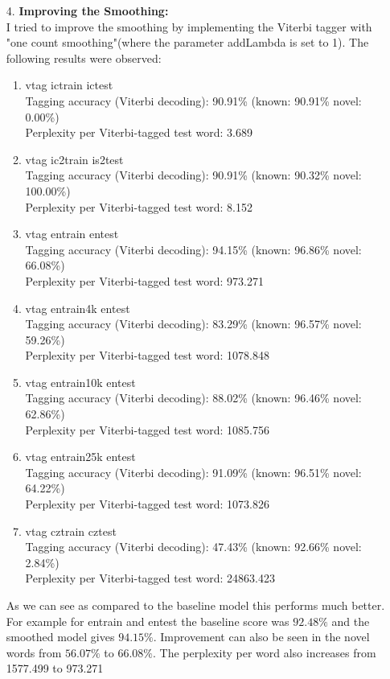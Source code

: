 \documentclass{article}
\begin{document}
\begin{enumerate}
\begin{enumerate}
\begin{enumerate}
    \end{enumerate}
\end{enumerate}
\item[4.]
\textbf{Improving the Smoothing:}
\\I tried to improve the smoothing by implementing the Viterbi tagger with "one count smoothing"(where the parameter addLambda is set to 1). The following results were observed:
\begin{enumerate}
    \item vtag ictrain ictest
\\Tagging accuracy (Viterbi decoding): 90.91\%	(known: 90.91\%	novel: 0.00\%)
\\Perplexity per Viterbi-tagged test word: 3.689
    \item vtag ic2train is2test
    \\Tagging accuracy (Viterbi decoding): 90.91\%     (known: 90.32\%  novel: 100.00\%)
\\Perplexity per Viterbi-tagged test word: 8.152
    \item vtag entrain entest
\\    Tagging accuracy (Viterbi decoding): 94.15\%     (known: 96.86\%  novel: 66.08\%)
\\Perplexity per Viterbi-tagged test word: 973.271
    \item vtag entrain4k entest
\\    Tagging accuracy (Viterbi decoding): 83.29\%     (known: 96.57\%  novel: 59.26\%)
\\Perplexity per Viterbi-tagged test word: 1078.848
    \item vtag entrain10k entest
\\  Tagging accuracy (Viterbi decoding): 88.02\%     (known: 96.46\%  novel: 62.86\%)
\\Perplexity per Viterbi-tagged test word: 1085.756
    \item vtag entrain25k entest
  \\Tagging accuracy (Viterbi decoding): 91.09\%     (known: 96.51\%  novel: 64.22\%)
\\Perplexity per Viterbi-tagged test word: 1073.826
    \item vtag cztrain cztest
    \\Tagging accuracy (Viterbi decoding): 47.43\%     (known: 92.66\%  novel: 2.84\%)
\\Perplexity per Viterbi-tagged test word: 24863.423
\end{enumerate}
As we can see as compared to the baseline model this performs much better.
For example for entrain and entest the baseline score was $92.48\%$ and the smoothed model gives $94.15\%$. Improvement can also be seen in the novel words from $56.07\%$ to $66.08\%$. The perplexity per word also increases from 1577.499 to 973.271


\end{enumerate}
\end{document}
